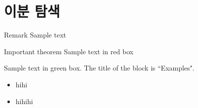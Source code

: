 \section{이분 탐색}
\begin{frame}{\textbf{\currentname}}
    \begin{block}{Remark}
    Sample text
    \end{block}

    \begin{alertblock}{Important theorem}
    Sample text in red box
    \end{alertblock}

    \begin{examples}
    Sample text in green box. The title of the block is ``Examples".
    \end{examples}
    
    \begin{itemize}
        \item hihi
        \item hihihi
    \end{itemize}
\end{frame}